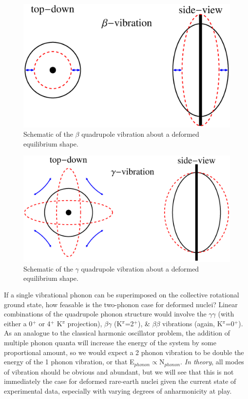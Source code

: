 \begin{figure}[h!] 
\begin{center}
\includegraphics[width=\textwidth]{SciDraw_beta_vibration.eps}
\caption{Schematic of the $\beta$ quadrupole vibration about a deformed equilibrium shape.}
\label{fig:beta_vibration}
\end{center}
\end{figure}

\begin{figure}[h!] 
\begin{center}
\includegraphics[width=\textwidth]{SciDraw_gamma_vibration.eps}
\caption{Schematic of the $\gamma$ quadrupole vibration about a deformed equilibrium shape.}
\label{fig:gamma_vibration}
\end{center}
\end{figure}

If a single vibrational phonon can be superimposed on the collective rotational ground state, how feasable is the two-phonon case for deformed nuclei? Linear combinations of the quadrupole phonon structure would involve the $\gamma\gamma$ (with either a 0$^+$ or 4$^+$ K$^\pi$ projection), $\beta\gamma$ (K$^\pi$=2$^+$), \& $\beta\beta$ vibrations (again, K$^\pi$=0$^+$). As an analogue to the classical harmonic oscillator problem, the addition of multiple phonon quanta will increase the energy of the system by some proportional amount, so we would expect a 2 phonon vibration to be double the energy of the 1 phonon vibration, or that E$_{phonon}\propto$N$_{phonon}$. \textit{In theory}, all modes of vibration should be obvious and abundant, but we will see that this is not immediately the case for deformed rare-earth nuclei given the current state of experimental data, especially with varying degrees of anharmonicity at play.


